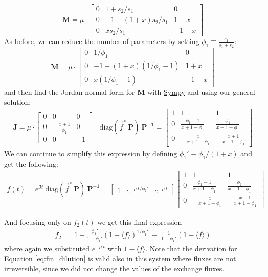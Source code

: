 \documentclass{article}
\newcommand{\finit}{\ensuremath{\vec{f}^\circ}}
\newcommand{\fin}{\ensuremath{\langle f \rangle}}
\begin{document}
\[
\mathbf{M} = \mu \cdot 
    \begin{bmatrix}
        0 & 1 + s_2/s_1 & 0  \\
        0 & - 1 - (1+x) s_2 / s_1 & 1+x \\
        0 & x s_2 / s_1 & -1-x
    \end{bmatrix}
\]
As before, we can reduce the number of parameters by setting $\phi_1 \equiv \frac{s_1}{s_1+s_2}$:
\[
\mathbf{M} = \mu \cdot 
    \begin{bmatrix}
        0 & 1/\phi_1 & 0  \\
        0 & - 1 - (1+x)(1/\phi_1-1) & 1+x \\
        0 &  x (1/\phi_1-1) & -1-x
    \end{bmatrix}
\]
and then find the Jordan normal form for $\mathbf{M}$ with \href{https://www.sympy.org/}{Sympy} and using our general solution:
\begin{eqnarray}
\mathbf{J} = \mu \cdot
  \begin{bmatrix}
    0 & 0 & 0 \\
    0 & -\frac{x+1}{\phi_1} & 0 \\
    0 & 0 & -1
\end{bmatrix}
~~~~
\text{diag}\left(\finit~\mathbf{P}\right)~\mathbf{P^{-1}} =
    \begin{bmatrix}
        1 & 1 & 1 \\
        0 & \frac{\phi_1 - 1}{x + 1 - \phi_1} & \frac{\phi_1}{x + 1 - \phi_1} \\
        0 & -\frac{x}{x + 1 - \phi_1} & -\frac{x+1}{x + 1 - \phi_1} 
    \end{bmatrix}
\end{eqnarray}
We can continue to simplify this expression by defining $\phi_1' \equiv \phi_1/(1+x)$ and get the following:
\begin{eqnarray}
    f(t) = e^{\mathbf{J}t}~\text{diag}\left(\finit~\mathbf{P}\right)~\mathbf{P^{-1}} = 
    \begin{bmatrix}
		1 & e^{-\mu\,t / \phi_1'} & e^{-\mu\,t}
	\end{bmatrix}
    \begin{bmatrix}
		1 & 1 & 1 \\
		0 & \frac{\phi_1 - 1}{x + 1 - \phi_1} & \frac{\phi_1}{x + 1 - \phi_1} \\
		0 & -\frac{x}{x + 1 - \phi_1} & -\frac{x+1}{x + 1 - \phi_1} 
	\end{bmatrix}
\end{eqnarray}

And focusing only on $f_2(t)$ we get this final expression
\begin{eqnarray}
    f_2 ~=~ 1 + \frac{\phi_1'}{1 - \phi_1'} (1-\fin)^{1/\phi_1'} ~-~ \frac{1}{1 - \phi_1'} (1-\fin)
	\label{eq:two_step_reversible}
\end{eqnarray}
where again we substituted $e^{-\mu\,t}$ with $1-\fin$. Note that the derivation for Equation \ref{eq:fin_dilution} is valid also in this system where fluxes are not irreversible, since we did not change the values of the exchange fluxes.
\end{document}
